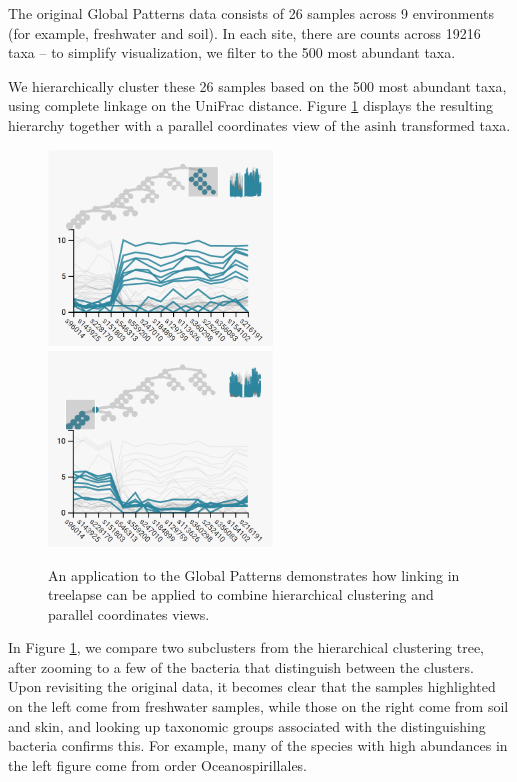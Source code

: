 \documentclass[12pt]{article}
\begin{document}
The original Global Patterns data consists of 26 samples across 9
environments (for example, freshwater and soil). In each site, there are
counts across 19216 taxa -- to simplify visualization, we filter to the
500 most abundant taxa.

We hierarchically cluster these 26 samples based on the 500 most
abundant taxa, using complete linkage on the UniFrac distance. Figure
\ref{fig:gptimebox} displays the resulting hierarchy together with a
parallel coordinates view of the \(\text{asinh}\) transformed taxa.

\begin{figure}
  {
    \centering
    \includegraphics[width=225px]{figure/gp_cluster1}
    \includegraphics[width=225px]{figure/gp_cluster2}
}

\caption{An application to the Global Patterns demonstrates how linking in treelapse can be applied to combine hierarchical clustering and parallel coordinates views.}\label{fig:gptimebox}
\end{figure}

In Figure \ref{fig:gptimebox}, we compare two subclusters from the
hierarchical clustering tree, after zooming to a few of the bacteria
that distinguish between the clusters. Upon revisiting the original
data, it becomes clear that the samples highlighted on the left come
from freshwater samples, while those on the right come from soil and
skin, and looking up taxonomic groups associated with the distinguishing
bacteria confirms this. For example, many of the species with high
abundances in the left figure come from order Oceanospirillales.
\end{document}
